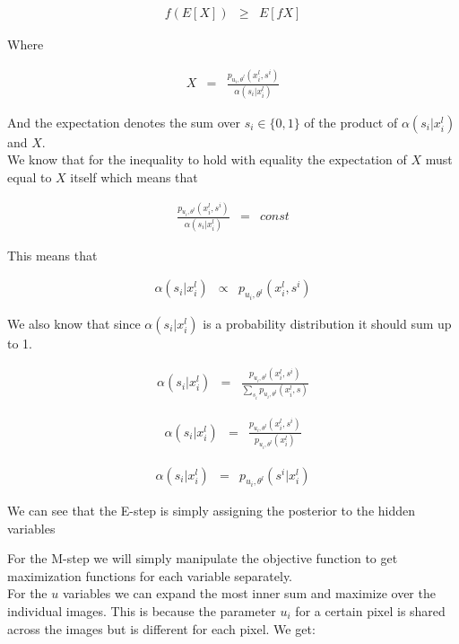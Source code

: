 \documentclass[11pt]{article}
\begin{document}
\begin{eqnarray}
f(E[X]) &\geq& E[fX]
\end{eqnarray}

Where 

\begin{eqnarray}
X &=& \frac{ p_{u_i,\theta^l}(x_i^l,s^i)}{\alpha(s_i | x_i^l)}
\end{eqnarray}

And the expectation denotes the sum over $s_i \in\{0,1\}$ of the product of $\alpha(s_i | x_i^l)$ and $X$. \\ 
We know that for the inequality to hold with equality the expectation of $X$ must equal to $X$ itself which 
means that 

\begin{eqnarray} 
\frac{ p_{u_i,\theta^l}(x_i^l,s^i)}{\alpha(s_i | x_i^l)} &=& const
\end{eqnarray}

This means that 

\begin{eqnarray}
\alpha(s_i | x_i^l) &\propto& p_{u_i,\theta^l}(x_i^l,s^i)
\end{eqnarray}

We also know that since $\alpha(s_i | x_i^l)$ is a probability distribution it should sum up to 1.

\begin{eqnarray}
\alpha(s_i | x_i^l) &=& \frac{ p_{u_i,\theta^l}(x_i^l,s^i)}{\sum_{s_i} p_{u_i,\theta^l}(x_i^l,s)}  
\end{eqnarray}

\begin{eqnarray}
\alpha(s_i | x_i^l) &=& \frac{ p_{u_i,\theta^l}(x_i^l,s^i)}{p_{u_i,\theta^l}(x_i^l)}  
\end{eqnarray}

\begin{eqnarray}
\alpha(s_i | x_i^l) &=& p_{u_i,\theta^l}(s^i | x_i^l)
\end{eqnarray}

We can see that the E-step is simply assigning the posterior to the hidden variables

For the M-step we will simply manipulate the objective function to get maximization functions for each variable separately. \\ 
For the $u$ variables we can expand the most inner sum and maximize over the individual images. This is because the parameter $u_i$ for a certain pixel is shared across the images but is different for each pixel. We get:
\end{document}
